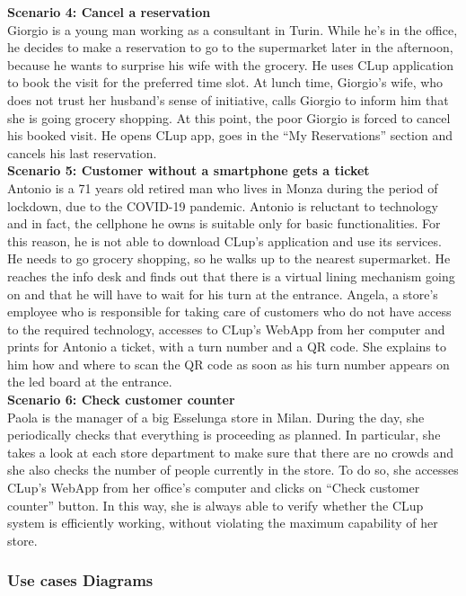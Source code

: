 \documentclass{article}
\begin{document}
\medskip
\textbf{Scenario 4: Cancel a reservation}\medskip\\
Giorgio is a young man working as a consultant in Turin. While he’s in the office, he decides to make a reservation to go to the supermarket later in the afternoon, because he wants to surprise his wife with the grocery. He uses CLup application to book the visit for the preferred time slot. At lunch time, Giorgio’s wife, who does not trust her husband’s sense of initiative, calls Giorgio to inform him that she is going grocery shopping. At this point, the poor Giorgio is forced to cancel his booked visit. He opens CLup app, goes in the “My Reservations” section and cancels his last reservation.\medskip\\
\medskip
\textbf{Scenario 5: Customer without a smartphone gets a ticket}\medskip\\
Antonio is a 71 years old retired man who lives in Monza during the period of lockdown, due to the COVID-19 pandemic. Antonio is reluctant to technology and in fact, the cellphone he owns is suitable only for basic functionalities. For this reason, he is not able to download CLup’s application and use its services. He needs to go grocery shopping, so he walks up to the nearest supermarket. He reaches the info desk and finds out that there is a virtual lining mechanism going on and that he will have to wait for his turn at the entrance. Angela, a store’s employee who is responsible for taking care of customers who do not have access to the required technology, accesses to CLup’s WebApp from her computer and prints for Antonio a ticket, with a turn number and a QR code. She explains to him how and where to scan the QR code as soon as his turn number appears on the led board at the entrance.\medskip\\
\medskip
\textbf{Scenario 6: Check customer counter}\medskip\\
Paola is the manager of a big Esselunga store in Milan. During the day, she periodically checks that everything is proceeding as planned. In particular, she takes a look at each store department to make sure that there are no crowds and she also checks the number of people currently in the store. To do so, she accesses CLup’s WebApp from her office’s computer and clicks on “Check customer counter” button. In this way, she is always able to verify whether the CLup system is efficiently working, without violating the maximum capability of her store.\medskip\\

\subsubsection{Use cases Diagrams}
\end{document}
